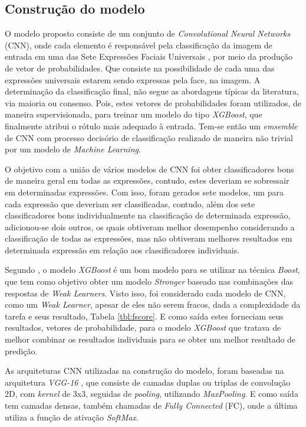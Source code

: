 \subsection{Construção do modelo}
O modelo proposto consiste de um conjunto de \emph{Convolutional Neural Networks} (CNN), onde cada elemento é responsável pela classificação da imagem de entrada em uma das Sete Expressões Faciais Universais \cite{}, por meio da produção de vetor de probabilidades. Que consiste na possibilidade de cada uma das expressões universais estarem sendo expressas pela face, na imagem. A determinação da classificação final, não segue as abordagens típicas da literatura, via maioria ou consenso. Pois, estes vetores de probabilidades foram utilizados, de maneira supervisionada, para treinar um modelo do tipo \emph{XGBoost}, que finalmente atribui o rótulo mais adequado à entrada. Tem-se então um \emph{emsemble} de CNN com processo decisório de classificação realizado de maneira não trivial por um modelo de \emph{Machine Learning}.

O objetivo com a união de vários modelos de CNN foi obter classificadores bons de maneira geral em todas as expressões, contudo, estes deveriam se sobressair em determinadas expressões. Com isso, foram gerados sete modelos, um para cada expressão que deveriam ser classificadas, contudo, além dos sete classificadores bons individualmente na classificação de determinada expressão, adicionou-se dois outros, os quais obtiveram melhor desempenho considerando a classificação de todas as expressões, mas não obtiveram melhores resultados em determinada expressão em relação aos classificadores individuais.

Segundo \cite{}, o modelo \emph{XGBoost} é um bom modelo para se utilizar na técnica \emph{Boost}, que tem como objetivo obter um modelo \emph{Stronger} baseado nas combinações das respostas de \emph{Weak Learners}. Visto isso, foi considerado cada modelo de CNN, como um \emph{Weak Learner}, apesar de eles não serem fracos, dada a complexidade da tarefa e seus resultado, Tabela \ref{tbl:fscore}. E como saída estes forneciam seus resultados, vetores de probabilidade, para o modelo \emph{XGBoost} que tratava de melhor combinar os resultados individuais para se obter um melhor resultado de predição.

As arquiteturas CNN utilizadas na construção do modelo, foram baseadas na arquitetura \emph{VGG-16} \cite{}, que consiste de camadas duplas ou triplas de convolução 2D, com \emph{kernel} de 3x3, seguidas de \emph{pooling}, utilizando \emph{MaxPooling}. E como saída tem camadas densas, também chamadas de \emph{Fully Connected} (FC), onde a última utiliza a função de ativação \emph{SoftMax}. 

